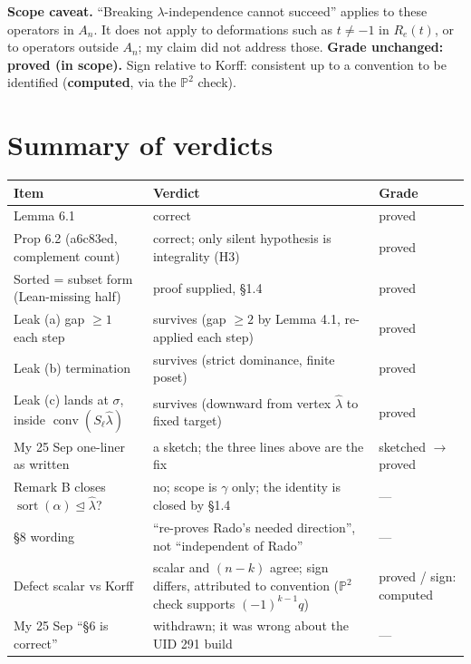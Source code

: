 \documentclass[11pt]{amsart}
\newcommand{\lh}{\hat\lambda}
\newcommand{\sort}{\operatorname{sort}}
\newcommand{\dom}{\trianglelefteq}
\begin{document}
\smallskip\noindent\textbf{Scope caveat.} ``Breaking $\lambda$-independence cannot succeed'' applies to these operators in $A_n$. It does not apply to deformations such as $t\ne-1$ in $R_e(t)$, or to operators outside $A_n$; my claim did not address those. \textbf{Grade unchanged: proved (in scope).} Sign relative to Korff: consistent up to a convention to be identified (\textbf{computed}, via the $\mathbb{P}^2$ check).

\section*{Summary of verdicts}
{\small
\begin{tabular}{p{}p{}p{}}
\toprule
Item & Verdict & Grade\\
\midrule
Lemma 6.1 & correct & proved\\
Prop 6.2 (a6c83ed, complement count) & correct; only silent hypothesis is integrality (H3) & proved\\
Sorted = subset form (Lean-missing half) & proof supplied, \S1.4 & proved\\
Leak (a) gap $\ge1$ each step & survives (gap $\ge2$ by Lemma 4.1, re-applied each step) & proved\\
Leak (b) termination & survives (strict dominance, finite poset) & proved\\
Leak (c) lands at $\sigma$, inside $\operatorname{conv}(S_\ell\lh)$ & survives (downward from vertex $\lh$ to fixed target) & proved\\
My 25 Sep one-liner as written & a sketch; the three lines above are the fix & sketched $\to$ proved\\
Remark B closes $\sort(\alpha)\dom\lh$? & no; scope is $\gamma$ only; the identity is closed by \S1.4 & ---\\
\S8 wording & ``re-proves Rado's needed direction'', not ``independent of Rado'' & ---\\
Defect scalar vs Korff & scalar and $(n-k)$ agree; sign differs, attributed to convention ($\mathbb{P}^2$ check supports $(-1)^{k-1}q$) & proved / sign: computed\\
My 25 Sep ``\S6 is correct'' & withdrawn; it was wrong about the UID 291 build & ---\\
\bottomrule
\end{tabular}
}
\end{document}

